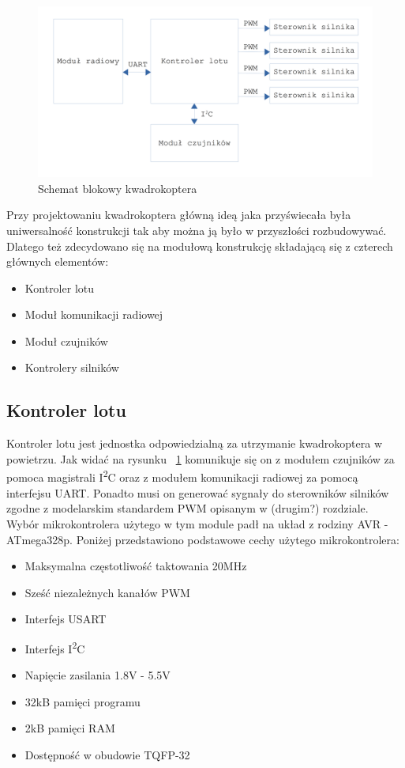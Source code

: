 \begin{figure}[H]
	\centering
	\includegraphics[scale=0.1]{Pictures/QuadroSchematIdeowy.png}
	\caption[Schemat blokowy kwadrokoptera]{Schemat blokowy kwadrokoptera}
	\label{fig:QuadroSchematIdeowy}
\end{figure}

Przy projektowaniu kwadrokoptera główną ideą jaka przyświecała była uniwersalność konstrukcji tak aby można ją było w przyszłości rozbudowywać. Dlatego też zdecydowano się na modułową konstrukcję składającą się z czterech głównych elementów:
\begin{itemize}
	\item Kontroler lotu
	\item Moduł komunikacji radiowej
	\item Moduł czujników
	\item Kontrolery silników
\end{itemize}

\subsection{Kontroler lotu}
Kontroler lotu jest jednostka odpowiedzialną za utrzymanie kwadrokoptera w powietrzu. Jak widać na rysunku ~\ref{fig:QuadroSchematIdeowy} komunikuje się on z modułem czujników za pomoca magistrali I\textsuperscript{2}C oraz z modułem komunikacji radiowej za pomocą interfejsu UART. Ponadto musi on generować sygnały do sterowników silników zgodne z modelarskim standardem PWM opisanym w (drugim?) rozdziale. Wybór mikrokontrolera użytego w tym module padł na układ z rodziny AVR - ATmega328p. Poniżej przedstawiono podstawowe cechy użytego mikrokontrolera:

\begin{itemize}
	\item Maksymalna częstotliwość taktowania 20MHz
	\item Sześć niezależnych kanałów PWM
	\item Interfejs USART
	\item Interfejs I\textsuperscript{2}C
	\item Napięcie zasilania 1.8V - 5.5V
	\item 32kB pamięci programu
	\item 2kB pamięci RAM
	\item Dostępność w obudowie TQFP-32
\end{itemize}

